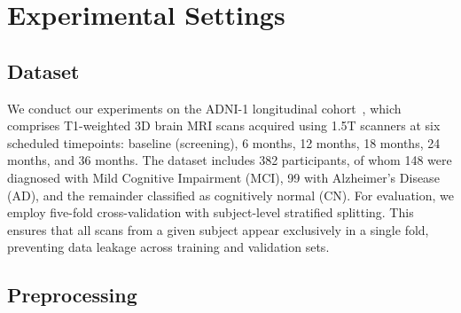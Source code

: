 \section{Experimental Settings}

\subsection{Dataset}

We conduct our experiments on the ADNI-1 longitudinal cohort~\cite{jack2008adni}, which comprises T1-weighted 3D brain MRI scans acquired using 1.5T scanners at six scheduled timepoints: baseline (screening), 6 months, 12 months, 18 months, 24 months, and 36 months. The dataset includes 382 participants, of whom 148 were diagnosed with Mild Cognitive Impairment (MCI), 99 with Alzheimer’s Disease (AD), and the remainder classified as cognitively normal (CN). For evaluation, we employ five-fold cross-validation with subject-level stratified splitting. This ensures that all scans from a given subject appear exclusively in a single fold, preventing data leakage across training and validation sets.


\subsection{Preprocessing}

